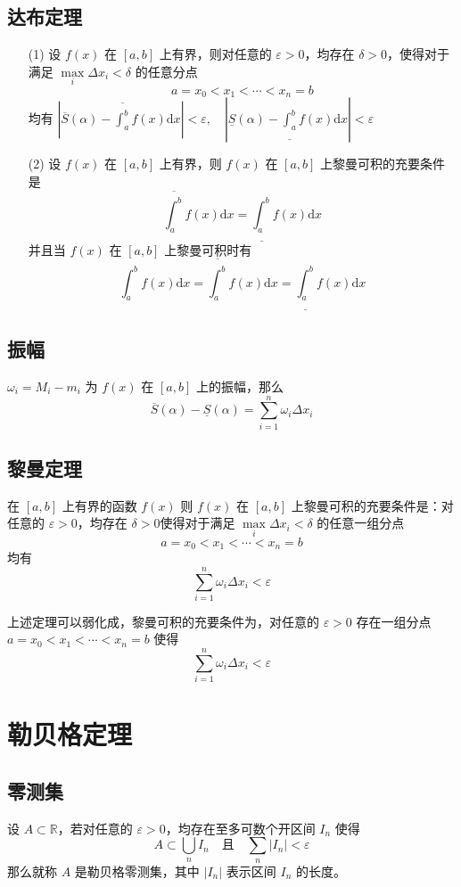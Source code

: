 		\subsection{达布定理}
			\begin{itemize}[leftmargin=1cm,itemindent=1cm]
				\item[(1)] 设 $f(x)$ 在 $[a,b]$ 上有界，则对任意的 $\varepsilon>0$，均存在 $\delta>0$，使得对于满足 $\max\limits_{i} \Delta x_i < \delta$ 的任意分点
				 $$a=x_0<x_1<\cdots<x_n=b$$
				 均有 $\left|\overline{S}(\alpha)-\overline{\int_a^b} f(x) \text{d} x\right|<\varepsilon, \quad \left|\underline{S}(\alpha)-\underline{\int_a^b} f(x) \text{d} x\right|<\varepsilon$
				 
				 \item[(2)] 设 $f(x)$ 在 $[a,b]$ 上有界，则 $f(x)$ 在 $[a,b]$ 上黎曼可积的充要条件是
				 $$\overline{\int_a^b} f(x) \text{d} x= \underline{\int_a^b} f(x) \text{d} x$$
				 并且当 $f(x)$ 在 $[a,b]$ 上黎曼可积时有
				 $$\int_a^b f(x) \text{d} x=\overline{\int_a^b} f(x) \text{d} x= \underline{\int_a^b} f(x) \text{d} x$$
			\end{itemize}
		
		\subsection{振幅}
			$\omega_i=M_i-m_i$ 为 $f(x)$ 在 $[a,b]$ 上的振幅，那么
			$$\overline{S}(\alpha)-\underline{S}(\alpha)=\sum\limits_{i=1}^n \omega_i\Delta x_i$$
		
		\subsection{黎曼定理}
			在 $[a,b]$ 上有界的函数 $f(x)$ 则 $f(x)$ 在 $[a,b]$ 上黎曼可积的充要条件是：对任意的 $\varepsilon>0$，均存在 $\delta>0$使得对于满足 $\max\limits_{i} \Delta x_i<\delta$ 的任意一组分点 
			$$a=x_0<x_1<\cdots<x_n=b$$ 均有
			$$\sum\limits_{i=1}^n \omega_i \Delta x_i < \varepsilon$$
			
			上述定理可以弱化成，黎曼可积的充要条件为，对任意的 $\varepsilon>0$ 存在一组分点 $a=x_0<x_1<\cdots<x_n=b$ 使得
		$$\sum\limits_{i=1}^n \omega_i \Delta x_i < \varepsilon$$
	
	\section{勒贝格定理}
		\subsection{零测集}
			设 $A\subset \mathbb{R}$，若对任意的 $\varepsilon>0$，均存在至多可数个开区间 $I_n$ 使得
			$$A\subset \bigcup\limits_{n} I_n \quad \text{且} \quad \sum\limits_{n} |I_n| <\varepsilon$$
			那么就称 $A$ 是勒贝格零测集，其中 $|I_n|$ 表示区间 $I_n$ 的长度。 
